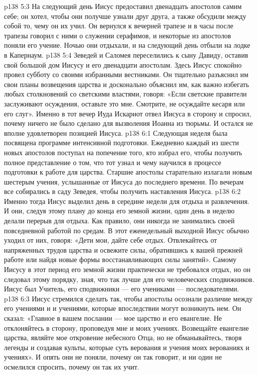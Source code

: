 \vs p138 5:3 На следующий день Иисус предоставил двенадцать апостолов самим себе; он хотел, чтобы они получше узнали друг друга, а также обсудили между собой то, чему он их учил. Он вернулся к вечерней трапезе и в часы после трапезы говорил с ними о служении серафимов, и некоторые из апостолов поняли его учение. Ночью они отдыхали, и на следующий день отбыли на лодке в Капернаум.
\vs p138 5:4 Зеведей и Саломея переселились к сыну Давиду, оставив свой большой дом Иисусу и его двенадцати апостолам. Здесь Иисус спокойно провел субботу со своими избранными вестниками. Он тщательно разъяснил им свои планы возвещения царства и досконально объяснил им, как важно избегать любых столкновений со светскими властями, говоря: «Если светские правители заслуживают осуждения, оставьте это мне. Смотрите, не осуждайте кесаря или его слуг». Именно в тот вечер Иуда Искариот отвел Иисуса в сторону и спросил, почему ничего не было сделано для вызволения Иоанна из тюрьмы. И остался не вполне удовлетворен позицией Иисуса.
\vs p138 6:1 Следующая неделя была посвящена программе интенсивной подготовки. Ежедневно каждый из шести новых апостолов поступал на попечение того, кто избрал его, чтобы получить полное представление о том, что тот узнал и чему научился в процессе подготовки к работе для царства. Старшие апостолы старательно излагали новым шестерым учения, услышанные от Иисуса до последнего времени. По вечерам все собирались в саду Зеведея, чтобы получить наставления Иисуса.
\vs p138 6:2 Именно тогда Иисус выделил день в середине недели для отдыха и развлечения. И они, следуя этому плану до конца его земной жизни, один день в неделю делали перерыв для отдыха. Как правило, они никогда не занимались своей повседневной работой по средам. В этот еженедельный выходной Иисус обычно уходил от них, говоря: «Дети мои, дайте себе отдых. Отвлекайтесь от напряженных трудов царства и освежите силы, обратившись к вашей прежней работе или найдя новые формы восстанавливающих силы занятий». Самому Иисусу в этот период его земной жизни практически не требовался отдых, но он следовал этому порядку, зная, что так лучше для его человеческих сподвижников. Иисус был Учитель, его сподвижники --- его учениками --- последователями.
\vs p138 6:3 \pc Иисус стремился сделать так, чтобы апостолы осознали различие между его учениями и  и учениями, которые впоследствии могут возникнуть  нем. Он сказал: «Главное в вашем послании --- мое царство и его евангелие. Не отклоняйтесь в сторону, проповедуя  мне и  моих учениях. Возвещайте евангелие царства, являйте мое откровение небесного Отца, но не обманывайтесь, творя легенды и создавая культы, которые суть верования и учения  моих верованиях и учениях». И опять они не поняли, почему он так говорит, и ни один не осмелился спросить, почему он так их учит.
